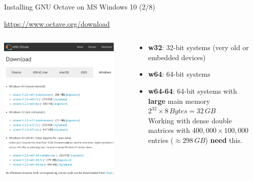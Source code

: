 \begin{frame}{Installing GNU Octave on MS Windows 10 (2/8)}
\begin{center}
\url{https://www.octave.org/download}
\end{center}
\begin{columns}
\begin{column}{0.5\textwidth}
\includegraphics[width=0.9\textwidth]{res/ms_windows/win_download_cropped.png}
\end{column}
\begin{column}{0.4\textwidth}
\begin{itemize}
\itemsep0.8em
\item
\textbf{w32}: 32-bit systems (very old or embedded devices)

\item
\textbf{w64}: 64-bit systems \greencheck

\item
\textbf{w64-64}: 64-bit systems with \textbf{large} main memory
$2^{32} \times 8 \,Bytes = 32 \,GB$\\[0.5em]

Working with dense double matrices with $400,000 \times 100,000$ entries
($\approx 298 \,GB$) \textbf{need} this.
\end{itemize}
\end{column}
\end{columns}
\end{frame}



